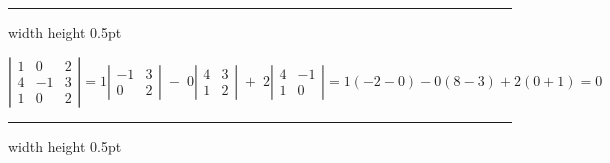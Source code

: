 \vspace{3mm}
\hrule width \textwidth height 0.5pt
\begin{exmp}
 \begin{displaymath}
  \left|
  \begin{array}{rrr}
   1 & 0 & 2\\
   4 & -1 & 3\\
   1 & 0 & 2
  \end{array}\right|
  = 1 \left|\begin{array}{rr} -1 & 3 \\ 0 & 2 \end{array}\right| \;-\;
  0 \left|\begin{array}{rr} 4 & 3 \\ 1 & 2 \end{array}\right| \;+\;
  2 \left|\begin{array}{rr} 4 & -1 \\ 1 & 0 \end{array}\right|
  = 1(-2 - 0) - 0(8 - 3) + 2(0 + 1) = 0
 \end{displaymath}
\end{exmp}
\hrule width \textwidth height 0.5pt
\newpage

